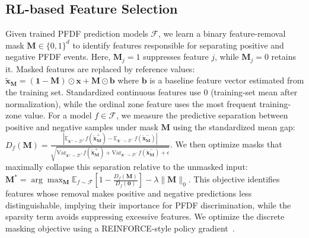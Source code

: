 \subsection{RL-based Feature Selection}\label{sec-RL}
Given trained PFDF prediction models $\mathcal{F}$, we learn a binary feature-removal mask $\mathbf{M}\in\{0,1\}^{d}$ to identify features responsible for separating positive and negative PFDF events. Here, $\mathbf{M}_{j}=1$ suppresses feature $j$, while $\mathbf{M}_{j}=0$ retains it. Masked features are replaced by reference values: $\tilde{\mathbf{x}}_{\mathbf{M}}
= (\mathbf{1}-\mathbf{M})\odot \mathbf{x}
+ \mathbf{M}\odot \mathbf{b}$ where $\mathbf{b}$ is a baseline feature vector estimated from the training set. Standardized continuous features use $0$ (training-set mean after normalization), while the ordinal zone feature uses the most frequent training-zone value. For a model $f\in\mathcal{F}$, we measure the predictive separation between positive and negative samples under mask $\mathbf{M}$ using the standardized mean gap:
$D_f(\mathbf{M})=
\frac{
\left|
\mathbb{E}_{\mathbf{x}^{+}\sim \mathcal{D}^{+}}
f(\tilde{\mathbf{x}}^{+}_{\mathbf{M}})
-
\mathbb{E}_{\mathbf{x}^{-}\sim \mathcal{D}^{-}}
f(\tilde{\mathbf{x}}^{-}_{\mathbf{M}})
\right|
}{
\sqrt{
\mathrm{Var}_{\mathbf{x}^{+}\sim \mathcal{D}^{+}}
f(\tilde{\mathbf{x}}^{+}_{\mathbf{M}})
+
\mathrm{Var}_{\mathbf{x}^{-}\sim \mathcal{D}^{-}}
f(\tilde{\mathbf{x}}^{-}_{\mathbf{M}})
+\epsilon
}}$.
We then optimize masks that maximally collapse this separation relative to the unmasked input: $\mathbf{M}^{*}
= \arg\max_{\mathbf{M}}\mathbb{E}_{f\sim\mathcal{F}}
[1-\frac{D_f(\mathbf{M})}{D_f(\boldsymbol{0})}
] -\lambda \|\mathbf{M}\|_{0}$. This objective identifies features whose removal makes positive and negative predictions less distinguishable, implying their importance for PFDF discrimination, while the sparsity term avoids suppressing excessive features. We optimize the discrete masking objective using a REINFORCE-style policy gradient~\cite{liu2021automated, fan2020autofs, fan2021interactive, sutton1999policy}.





